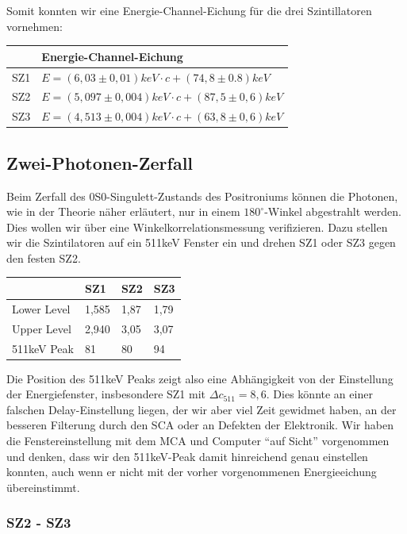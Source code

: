 Somit konnten wir eine Energie-Channel-Eichung für die drei Szintillatoren vornehmen:
\begin{center}
\begin{tabular}{ll}
\toprule
     & Energie-Channel-Eichung\\
\midrule
 SZ1 & $E = (6,03 \pm 0,01) keV \cdot c + (74,8 \pm 0.8) keV$\\
 SZ2 & $E = (5,097 \pm 0,004) keV \cdot c + (87,5 \pm 0,6) keV$\\
 SZ3 & $E = (4,513 \pm 0,004) keV \cdot c + (63,8 \pm 0,6) keV$\\
\bottomrule 
\end{tabular}
\end{center}

\subsection{Zwei-Photonen-Zerfall}

Beim Zerfall des 0S0-Singulett-Zustands des Positroniums können die Photonen, wie in der Theorie näher erläutert, nur in einem $180^\circ$-Winkel abgestrahlt werden. Dies wollen wir über eine Winkelkorrelationsmessung verifizieren. Dazu stellen wir die Szintilatoren auf ein 511keV Fenster ein und drehen SZ1 oder SZ3 gegen den festen SZ2. 

\begin{center}
\begin{tabular}{llll}
\toprule
 & SZ1 & SZ2 & SZ3\\
\midrule
Lower Level & 1,585 & 1,87 & 1,79\\
Upper Level & 2,940 & 3,05 & 3,07\\
511keV Peak & 81  & 80 & 94\\
\bottomrule
\end{tabular}
\end{center}

Die Position des 511keV Peaks zeigt also eine Abhängigkeit von der Einstellung der Energiefenster, insbesondere SZ1 mit $\Delta c_{511} = 8,6$. Dies könnte an einer falschen Delay-Einstellung liegen, der wir aber viel Zeit gewidmet haben, an der besseren Filterung durch den SCA oder an Defekten der Elektronik. Wir haben die Fenstereinstellung mit dem MCA und Computer "`auf Sicht"' vorgenommen und denken, dass wir den 511keV-Peak damit hinreichend genau einstellen konnten, auch wenn er nicht mit der vorher vorgenommenen Energieeichung übereinstimmt.

\subsubsection{SZ2 - SZ3}

